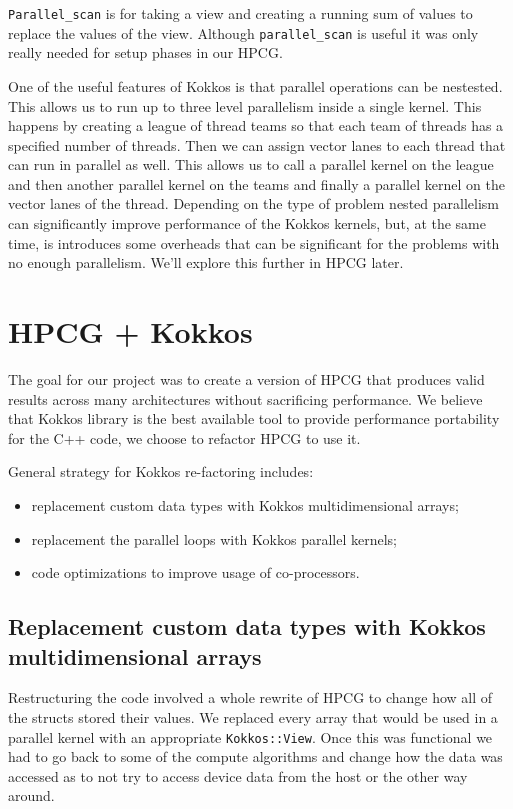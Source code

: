 \documentclass{ccr15}
\begin{document}
\texttt{Parallel\_scan} is for taking a view and creating a running sum of values
to replace the values of the view. Although \texttt{parallel\_scan} is useful it was only really needed
for setup phases in our HPCG.

One of the useful features of Kokkos is that parallel operations can be nestested. This allows us to run up to three level parallelism inside a single kernel. This
happens by creating a league of thread teams so that each team of threads has a specified number of threads.
Then we can assign vector lanes to each thread that can run in parallel as well. This allows us to call a parallel kernel on the 
league and then another parallel kernel on the teams and finally a parallel kernel on the vector lanes of the thread.
Depending on the type of problem nested parallelism can significantly improve performance of the Kokkos kernels, but, at the same time, is introduces some overheads that can 
be significant for the problems with no enough parallelism. We'll explore this further in HPCG later.

\section{HPCG + Kokkos}

The goal for our project was to create a version of HPCG that 
produces valid results across many architectures without sacrificing performance.
We believe that Kokkos library is the best available tool to provide performance portability for the C++ code, we choose to refactor HPCG to use it.

General strategy for Kokkos re-factoring includes: 
\begin{itemize}
\item replacement custom data types with Kokkos multidimensional arrays; 
\item replacement the parallel loops with Kokkos parallel kernels; 
\item code optimizations to improve usage of co-processors.
\end{itemize}


\subsection{Replacement custom data types with Kokkos multidimensional arrays}

Restructuring the code involved a whole rewrite of HPCG to change how all of the structs stored
their values. We replaced every array that would be used in a parallel kernel with an appropriate
\texttt{Kokkos::View}. Once this was functional we had to go back to some of the compute algorithms and change
how the data was accessed as to not try to access device data from the host or the
other way around.
\end{document}
